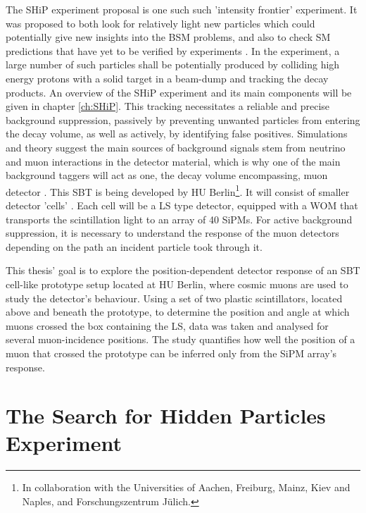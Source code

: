 	The \ac{SHiP} experiment proposal is one such such 'intensity frontier' experiment.
	It was proposed to both look for relatively light new particles which could potentially give new insights into the \ac{BSM} problems, and also to check \ac{SM} predictions that have yet to be verified by experiments \cite{SHIP-proposal,SHIP-technical}.
	In the experiment, a large number of such particles shall be potentially produced by colliding high energy protons with a solid target in a beam-dump and tracking the decay products. An overview of the \ac{SHiP} experiment and its main components will be given in chapter \ref{ch:SHiP}.
	This tracking necessitates a reliable and precise background suppression, passively by preventing unwanted particles from entering the decay volume, as well as actively, by identifying false positives. Simulations and theory suggest the main sources of background signals stem from neutrino and muon interactions in the detector material, which is why one of the main background taggers will act as one, the decay volume encompassing, muon detector \cite{SHIP-DESIGN-2019}. This \acf{SBT} is being developed by \ac{HU} Berlin\footnote{In collaboration with the Universities of Aachen, Freiburg, Mainz, Kiev and Naples, and Forschungszentrum Jülich.}. It will consist of smaller detector 'cells' \cite{SHIP-DESIGN-2019}. Each cell will be a \ac{LS} type detector, equipped with a \ac{WOM} that transports the scintillation light to an array of 40 \acsp{SiPM}. For active background suppression, it is necessary to understand the response of the muon detectors depending on the path an incident particle took through it. 
	
	This thesis' goal is to explore the position-dependent detector response of an \ac{SBT} cell-like prototype setup located at \ac{HU} Berlin, where cosmic muons are used to study the detector's behaviour. Using a set of two plastic scintillators, located above and beneath the prototype, to determine the position and angle at which muons crossed the box containing the \ac{LS}, data was taken and analysed for several muon-incidence positions. The study quantifies how well the position of a muon that crossed the prototype can be inferred only from the \ac{SiPM} array's response.

 


\chapter{The Search for Hidden Particles Experiment}
\label{ch:SHiP}
	
